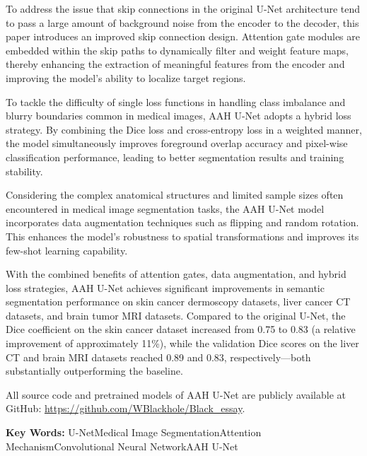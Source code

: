 To address the issue that skip connections in the original U-Net architecture tend to pass a large amount of background noise from the encoder to the decoder, this paper introduces an improved skip connection design. Attention gate modules are embedded within the skip paths to dynamically filter and weight feature maps, thereby enhancing the extraction of meaningful features from the encoder and improving the model's ability to localize target regions.

To tackle the difficulty of single loss functions in handling class imbalance and blurry boundaries common in medical images, AAH U-Net adopts a hybrid loss strategy. By combining the Dice loss and cross-entropy loss in a weighted manner, the model simultaneously improves foreground overlap accuracy and pixel-wise classification performance, leading to better segmentation results and training stability.

Considering the complex anatomical structures and limited sample sizes often encountered in medical image segmentation tasks, the AAH U-Net model incorporates data augmentation techniques such as flipping and random rotation. This enhances the model’s robustness to spatial transformations and improves its few-shot learning capability.

With the combined benefits of attention gates, data augmentation, and hybrid loss strategies, AAH U-Net achieves significant improvements in semantic segmentation performance on skin cancer dermoscopy datasets, liver cancer CT datasets, and brain tumor MRI datasets. Compared to the original U-Net, the Dice coefficient on the skin cancer dataset increased from 0.75 to 0.83 (a relative improvement of approximately 11\%), while the validation Dice scores on the liver CT and brain MRI datasets reached 0.89 and 0.83, respectively—both substantially outperforming the baseline.

All source code and pretrained models of AAH U-Net are publicly available at GitHub: \url{https://github.com/WBlackhole/Black_essay}.

\textbf{ Key Words:} U-Net\quad Medical Image Segmentation\quad Attention Mechanism\quad Convolutional Neural Network\quad AAH U-Net

